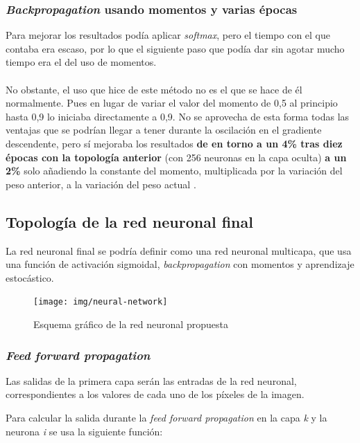 \subsubsection{\textit{Backpropagation} usando momentos y varias épocas}

Para mejorar los resultados podía aplicar \textit{softmax}, pero el tiempo con el que contaba era escaso, por lo que el siguiente paso que podía dar sin agotar mucho tiempo era el del uso de momentos.
\\ \\
No obstante, el uso que hice de este método no es el que se hace de él normalmente. Pues en lugar de variar el valor del momento de 0,5 al principio hasta 0,9 lo iniciaba directamente a 0,9. No se aprovecha de esta forma todas las ventajas que se podrían llegar a tener durante la oscilación en el gradiente descendente, pero sí mejoraba los resultados \textbf{de en torno a un 4\% tras diez épocas con la topología anterior} (con 256 neuronas en la capa oculta) \textbf{a un 2\%} solo añadiendo la constante del momento, multiplicada por la variación del peso anterior, a la variación del peso actual \cite{backpropagation-au}.

\subsection{Topología de la red neuronal final}

La red neuronal final se podría definir como una red neuronal multicapa, que usa una función de activación sigmoidal, \textit{backpropagation} con momentos y aprendizaje estocástico.

\begin{figure}[H]
	\centering
	\texttt{[image: img/neural-network]}
	\caption{Esquema gráfico de la red neuronal propuesta}
	\label{fig:neural-network}
\end{figure}

\subsubsection{\textit{Feed forward propagation}}

Las salidas de la primera capa serán las entradas de la red neuronal, correspondientes a los valores de cada uno de los píxeles de la imagen.

Para calcular la salida durante la \textit{feed forward propagation} en la capa \textit{k} y la neurona \textit{i} se usa la siguiente función:

